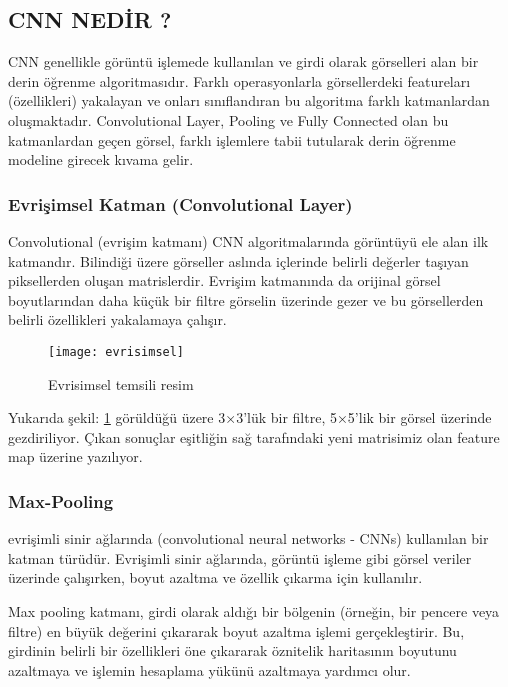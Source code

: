 \documentclass[10pt,a4paper]{report}
\begin{document}
\begin{justify}
	\subsection{CNN NEDİR ?}
	 CNN genellikle görüntü işlemede kullanılan ve girdi olarak görselleri alan bir derin öğrenme algoritmasıdır. Farklı operasyonlarla görsellerdeki featureları (özellikleri) yakalayan ve onları sınıflandıran bu algoritma farklı katmanlardan oluşmaktadır. Convolutional Layer, Pooling ve Fully Connected olan bu katmanlardan geçen görsel, farklı işlemlere tabii tutularak derin öğrenme modeline girecek kıvama gelir.\newline
	
	\subsubsection{Evrişimsel Katman (Convolutional Layer)}
	
	Convolutional (evrişim katmanı) CNN algoritmalarında görüntüyü ele alan ilk katmandır. Bilindiği üzere görseller aslında içlerinde belirli değerler taşıyan piksellerden oluşan matrislerdir. Evrişim katmanında da orijinal görsel boyutlarından daha küçük bir filtre görselin üzerinde gezer ve bu görsellerden belirli özellikleri yakalamaya çalışır.
	\clearpage
	\begin{figure}[!h]
		
		\raggedright
		\texttt{[image: evrisimsel]}
		\caption{Evrisimsel temsili resim \cite{bozkurt2021cnn}}
		\label{evrisimsel}
	\end{figure}
	
	Yukarıda şekil: \ref{evrisimsel} görüldüğü üzere 3×3’lük bir filtre, 5×5’lik bir görsel üzerinde gezdiriliyor. Çıkan sonuçlar eşitliğin sağ tarafındaki yeni matrisimiz olan feature map üzerine yazılıyor.\newline
	
	\subsubsection{Max-Pooling}
	
	evrişimli sinir ağlarında (convolutional neural networks - CNNs) kullanılan bir katman türüdür. Evrişimli sinir ağlarında, görüntü işleme gibi görsel veriler üzerinde çalışırken, boyut azaltma ve özellik çıkarma için kullanılır.\newline
	
	
	Max pooling katmanı, girdi olarak aldığı bir bölgenin (örneğin, bir pencere veya filtre) en büyük değerini çıkararak boyut azaltma işlemi gerçekleştirir. Bu, girdinin belirli bir özellikleri öne çıkararak öznitelik haritasının boyutunu azaltmaya ve işlemin hesaplama yükünü azaltmaya yardımcı olur.\newline
	

\end{justify}
\end{document}
